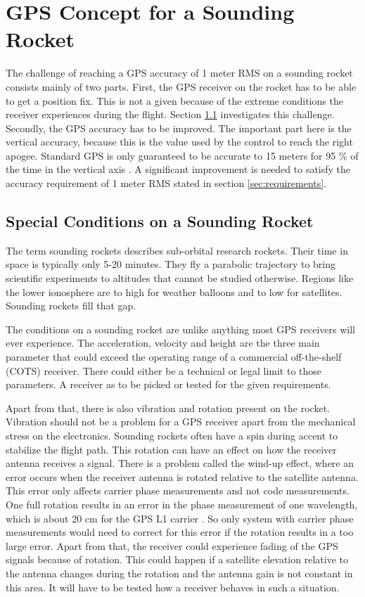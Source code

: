 \chapter{GPS Concept for a Sounding Rocket}

The challenge of reaching a GPS accuracy of 1 meter RMS on a sounding rocket consists mainly of two parts.
First, the GPS receiver on the rocket has to be able to get a position fix.
This is not a given because of the extreme conditions the receiver experiences during the flight.
Section \ref{sec:special_conditions} investigates this challenge.
Secondly, the GPS accuracy has to be improved.
The important part here is the vertical accuracy, because this is the value used by the control to reach the right apogee.
Standard GPS is only guaranteed to be accurate to 15 meters for 95 \% of the time in the vertical axis \cite{SPS_Performance}.
A significant improvement is needed to satisfy the accuracy requirement of 1 meter RMS stated in section \ref{sec:requirements}.

\section{Special Conditions on a Sounding Rocket}\label{sec:special_conditions}

The term sounding rockets describes sub-orbital research rockets.
Their time in space is typically only 5-20 minutes.
They fly a parabolic trajectory to bring scientific experiments to altitudes that cannot be studied otherwise.
Regions like the lower ionosphere are to high for weather balloons and to low for satellites.
Sounding rockets fill that gap.
\cite{Sounding_Rockets}

The conditions on a sounding rocket are unlike anything most GPS receivers will ever experience.
The acceleration, velocity and height are the three main parameter that could exceed the operating range of a commercial off-the-shelf (COTS) receiver.
There could either be a technical or legal limit to those parameters.
A receiver as to be picked or tested for the given requirements.

Apart from that, there is also vibration and rotation present on the rocket.
Vibration should not be a problem for a GPS receiver apart from the mechanical stress on the electronics.
Sounding rockets often have a spin during accent to stabilize the flight path.
This rotation can have an effect on how the receiver antenna receives a signal.
There is a problem called the wind-up effect, where an error occurs when the receiver antenna is rotated relative to the satellite antenna.
This error only affects carrier phase measurements and not code measurements.
One full rotation results in an error in the phase measurement of one wavelength, which is about 20 cm for the GPS L1 carrier \cite{Wind_up}. 
So only system with carrier phase measurements would need to correct for this error if the rotation results in a too large error.
Apart from that, the receiver could experience fading of the GPS signals because of rotation.
This could happen if a satellite elevation relative to the antenna changes during the rotation and the antenna gain is not constant in this area.
It will have to be tested how a receiver behaves in such a situation.

